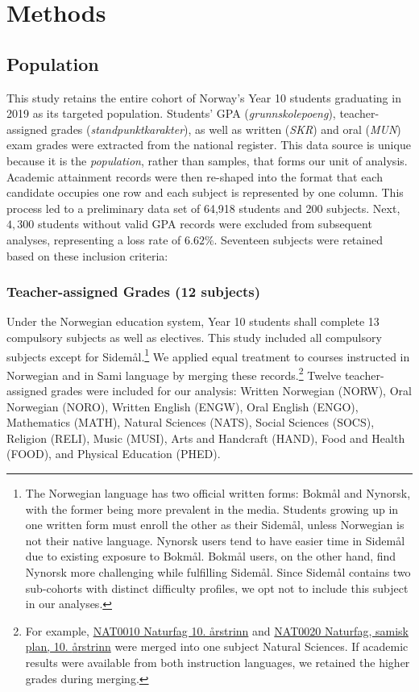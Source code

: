 \section{Methods}

\subsection{Population}

This study retains the entire cohort of Norway's Year 10 students graduating in 2019 as its targeted population. Students' GPA (\textit{grunnskolepoeng}), teacher-assigned grades (\textit{standpunktkarakter}), as well as written (\textit{SKR}) and oral (\textit{MUN}) exam grades were extracted from the national register. This data source is unique because it is the \emph{population}, rather than samples, that forms our unit of analysis. Academic attainment records were then re-shaped into the format that each candidate occupies one row and each subject is represented by one column. This process led to a preliminary data set of 64,918 students and 200 subjects. Next, $4,300$ students without valid GPA records were excluded from subsequent analyses, representing a loss rate of $6.62\%$. Seventeen subjects were retained based on these inclusion criteria:

\subsubsection{Teacher-assigned Grades (12 subjects)}

Under the Norwegian education system, Year 10 students shall complete 13 compulsory subjects as well as electives. This study included all compulsory subjects except for Sidem{\aa}l.\footnote{The Norwegian language has two official written forms: Bokm{\aa}l and Nynorsk, with the former being more prevalent in the media. Students growing up in one written form must enroll the other as their Sidem{\aa}l, unless Norwegian is not their native language. Nynorsk users tend to have easier time in Sidem{\aa}l due to existing exposure to Bokm{\aa}l. Bokm{\aa}l users, on the other hand, find Nynorsk more challenging while fulfilling Sidem{\aa}l. Since Sidem{\aa}l contains two sub-cohorts with distinct difficulty profiles, we opt not to include this subject in our analyses.} We applied equal treatment to courses instructed in Norwegian and in Sami language by merging these records.\footnote{For example, \href{https://www.udir.no/kl06/nat0010}{NAT0010 Naturfag 10. {\aa}rstrinn} and \href{https://www.udir.no/kl06/nat0020}{NAT0020 Naturfag, samisk plan, 10. {\aa}rstrinn} were merged into one subject Natural Sciences. If academic results were available from both instruction languages, we retained the higher grades during merging.} Twelve teacher-assigned grades were included for our analysis: Written Norwegian (NORW), Oral Norwegian (NORO), Written English (ENGW), Oral English (ENGO), Mathematics (MATH), Natural Sciences (NATS), Social Sciences (SOCS), Religion (RELI), Music (MUSI), Arts and Handcraft (HAND), Food and Health (FOOD), and Physical Education (PHED).

